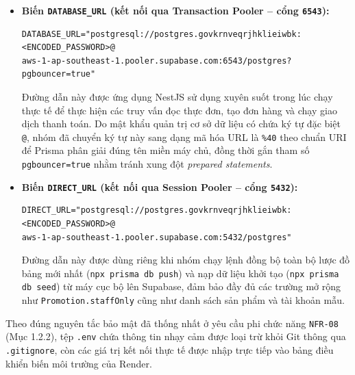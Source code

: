 \begin{itemize}
    \item \textbf{Biến \texttt{DATABASE\_URL} (kết nối qua Transaction Pooler -- cổng \texttt{6543}):}
    \begin{verbatim}
DATABASE_URL="postgresql://postgres.govkrnveqrjhklieiwbk:<ENCODED_PASSWORD>@
aws-1-ap-southeast-1.pooler.supabase.com:6543/postgres?pgbouncer=true"
    \end{verbatim}
    Đường dẫn này được ứng dụng NestJS sử dụng xuyên suốt trong lúc chạy thực tế để thực hiện các truy vấn đọc thực đơn, tạo đơn hàng và chạy giao dịch thanh toán. Do mật khẩu quản trị cơ sở dữ liệu có chứa ký tự đặc biệt \texttt{@}, nhóm đã chuyển ký tự này sang dạng mã hóa URL là \texttt{\%40} theo chuẩn URI để Prisma phân giải đúng tên miền máy chủ, đồng thời gắn tham số \texttt{pgbouncer=true} nhằm tránh xung đột \textit{prepared statements}.

    \item \textbf{Biến \texttt{DIRECT\_URL} (kết nối qua Session Pooler -- cổng \texttt{5432}):}
    \begin{verbatim}
DIRECT_URL="postgresql://postgres.govkrnveqrjhklieiwbk:<ENCODED_PASSWORD>@
aws-1-ap-southeast-1.pooler.supabase.com:5432/postgres"
    \end{verbatim}
    Đường dẫn này được dùng riêng khi nhóm chạy lệnh đồng bộ toàn bộ lược đồ bảng mới nhất (\texttt{npx prisma db push}) và nạp dữ liệu khởi tạo (\texttt{npx prisma db seed}) từ máy cục bộ lên Supabase, đảm bảo đầy đủ các trường mở rộng như \texttt{Promotion.staffOnly} cũng như danh sách sản phẩm và tài khoản mẫu.
\end{itemize}

Theo đúng nguyên tắc bảo mật đã thống nhất ở yêu cầu phi chức năng \texttt{NFR-08} (Mục 1.2.2), tệp \texttt{.env} chứa thông tin nhạy cảm được loại trừ khỏi Git thông qua \texttt{.gitignore}, còn các giá trị kết nối thực tế được nhập trực tiếp vào bảng điều khiển biến môi trường của Render.

